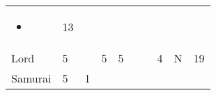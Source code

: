 \documentclass[12pt]{article}
\begin{document}
\begin{longtable}[]{@{}llllllllll@{}}
\begin{minipage}[t]{0.07\columnwidth}\raggedright\strut
\begin{itemize}
\item
\end{itemize}
\strut\end{minipage} &
\begin{minipage}[t]{0.08\columnwidth}\raggedright\strut
13
\strut\end{minipage}\tabularnewline
\begin{minipage}[t]{0.13\columnwidth}\raggedright\strut
Lord
\strut\end{minipage} &
\begin{minipage}[t]{0.06\columnwidth}\raggedright\strut
5
\strut\end{minipage} &
\begin{minipage}[t]{0.06\columnwidth}\raggedright\strut
\strut\end{minipage} &
\begin{minipage}[t]{0.06\columnwidth}\raggedright\strut
5
\strut\end{minipage} &
\begin{minipage}[t]{0.06\columnwidth}\raggedright\strut
5
\strut\end{minipage} &
\begin{minipage}[t]{0.06\columnwidth}\raggedright\strut
\strut\end{minipage} &
\begin{minipage}[t]{0.06\columnwidth}\raggedright\strut
\strut\end{minipage} &
\begin{minipage}[t]{0.06\columnwidth}\raggedright\strut
4
\strut\end{minipage} &
\begin{minipage}[t]{0.07\columnwidth}\raggedright\strut
N
\strut\end{minipage} &
\begin{minipage}[t]{0.08\columnwidth}\raggedright\strut
19
\strut\end{minipage}\tabularnewline
\begin{minipage}[t]{0.13\columnwidth}\raggedright\strut
Samurai
\strut\end{minipage} &
\begin{minipage}[t]{0.06\columnwidth}\raggedright\strut
5
\strut\end{minipage} &
\begin{minipage}[t]{0.06\columnwidth}\raggedright\strut
1
\strut\end{minipage} &

\end{longtable}
\end{document}
